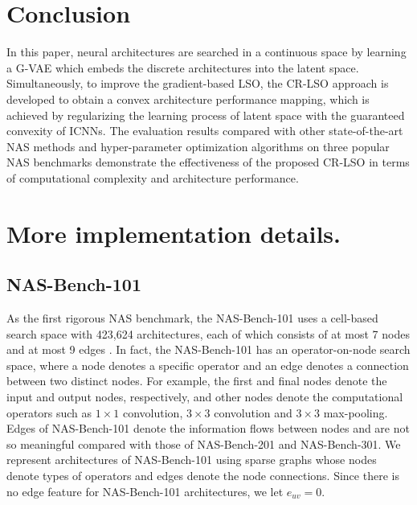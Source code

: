 \documentclass[10pt,twocolumn,letterpaper]{article}
\begin{document}
\section{Conclusion}
In this paper, neural architectures are searched in a continuous space by learning a G-VAE which embeds the discrete architectures into the latent space. Simultaneously, to improve the gradient-based LSO, the CR-LSO approach is developed to obtain a convex architecture performance mapping, which is achieved by regularizing the learning process of latent space with the guaranteed convexity of ICNNs. The evaluation results compared with other state-of-the-art NAS methods and hyper-parameter optimization algorithms on three popular NAS benchmarks demonstrate the effectiveness of the proposed CR-LSO in terms of computational complexity and architecture performance. 

{\small


}

\clearpage
\appendix
\section{More implementation details.}
\label{implementation details}
\subsection{NAS-Bench-101}
As the first rigorous NAS benchmark, the NAS-Bench-101 uses a cell-based search space with 423,624 architectures, each of which consists of at most 7 nodes and at most 9 edges \cite{DBLP:conf/icml/YingKCR0H19}. In fact, the NAS-Bench-101 has an operator-on-node search space, where a node denotes a specific operator and an edge denotes a connection between two distinct nodes. For example, the first and final nodes denote the input and output nodes, respectively, and other nodes denote the computational operators such as $1\times1$ convolution, $3\times3$ convolution and $3\times3$ max-pooling. Edges of NAS-Bench-101 denote the information flows between nodes and are not so meaningful compared with those of NAS-Bench-201 and NAS-Bench-301. We represent architectures of NAS-Bench-101 using sparse graphs \cite{fey2019fast} whose nodes denote types of operators and edges denote the node connections. Since there is no edge feature for NAS-Bench-101 architectures, we let $e_{uv}=0$.  
\end{document}
